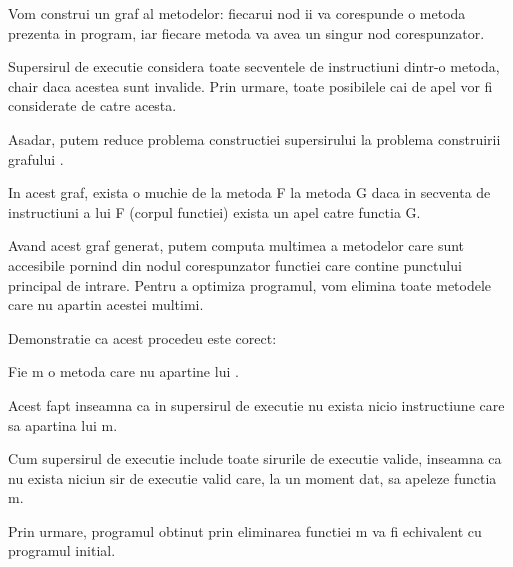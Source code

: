 Vom construi un graf  al metodelor: fiecarui nod ii va
corespunde o metoda prezenta in program, iar fiecare metoda va
avea un singur nod corespunzator.

Supersirul de executie considera toate secventele de instructiuni
dintr-o metoda, chair daca acestea sunt invalide.
Prin urmare, toate posibilele cai de apel vor fi considerate de
catre acesta.

Asadar, putem reduce problema constructiei supersirului la
problema construirii grafului .

In acest graf, exista o muchie de la metoda F la metoda
G daca in secventa de instructiuni a lui F (corpul functiei)
exista un apel catre functia G.

Avand acest graf generat, putem computa multimea  a metodelor
care sunt accesibile pornind din nodul corespunzator functiei care
contine punctului principal de intrare.
Pentru a optimiza programul, vom elimina toate metodele care nu
apartin acestei multimi.

Demonstratie ca acest procedeu este corect:
\begin{lemma}

Fie m o metoda care nu apartine lui .

Acest fapt inseamna ca in supersirul de executie nu exista nicio
instructiune care sa apartina lui m.

Cum supersirul de executie include toate sirurile de executie
valide, inseamna ca nu exista niciun sir de executie valid care,
la un moment dat, sa apeleze functia m.

Prin urmare, programul obtinut prin eliminarea functiei m va fi
echivalent cu programul initial.
\end{lemma}

